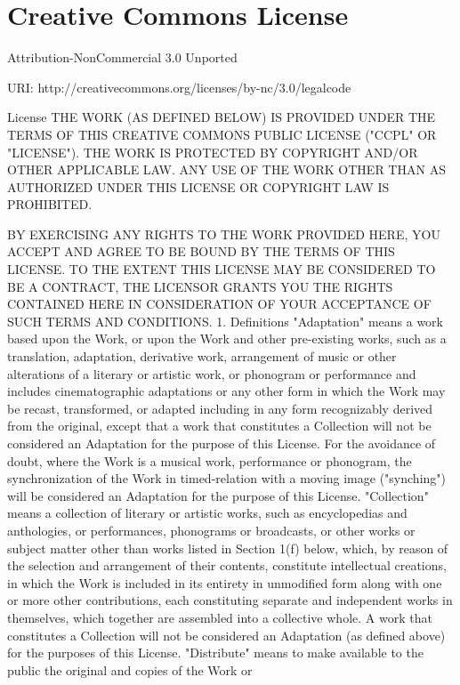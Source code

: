 \documentclass[oneside]{book}
\begin{document}
\chapter{Creative Commons License}

Attribution-NonCommercial 3.0 Unported

URI: http://creativecommons.org/licenses/by-nc/3.0/legalcode


License THE WORK (AS DEFINED BELOW) IS PROVIDED UNDER THE TERMS OF THIS CREATIVE
COMMONS PUBLIC LICENSE ("CCPL" OR "LICENSE"). THE WORK IS PROTECTED BY COPYRIGHT
AND/OR OTHER APPLICABLE LAW. ANY USE OF THE WORK OTHER THAN AS AUTHORIZED UNDER
THIS LICENSE OR COPYRIGHT LAW IS PROHIBITED.

BY EXERCISING ANY RIGHTS TO THE WORK PROVIDED HERE, YOU ACCEPT AND AGREE TO BE
BOUND BY THE TERMS OF THIS LICENSE. TO THE EXTENT THIS LICENSE MAY BE CONSIDERED
TO BE A CONTRACT, THE LICENSOR GRANTS YOU THE RIGHTS CONTAINED HERE IN
CONSIDERATION OF YOUR ACCEPTANCE OF SUCH TERMS AND CONDITIONS.  1. Definitions
"Adaptation" means a work based upon the Work, or upon the Work and other
pre-existing works, such as a translation, adaptation, derivative work,
arrangement of music or other alterations of a literary or artistic work, or
phonogram or performance and includes cinematographic adaptations or any other
form in which the Work may be recast, transformed, or adapted including in any
form recognizably derived from the original, except that a work that constitutes
a Collection will not be considered an Adaptation for the purpose of this
License. For the avoidance of doubt, where the Work is a musical work,
performance or phonogram, the synchronization of the Work in timed-relation with
a moving image ("synching") will be considered an Adaptation for the purpose of
this License.  "Collection" means a collection of literary or artistic works,
such as encyclopedias and anthologies, or performances, phonograms or
broadcasts, or other works or subject matter other than works listed in Section
1(f) below, which, by reason of the selection and arrangement of their contents,
constitute intellectual creations, in which the Work is included in its entirety
in unmodified form along with one or more other contributions, each constituting
separate and independent works in themselves, which together are assembled into
a collective whole. A work that constitutes a Collection will not be considered
an Adaptation (as defined above) for the purposes of this License.  "Distribute"
means to make available to the public the original and copies of the Work or
\end{document}
